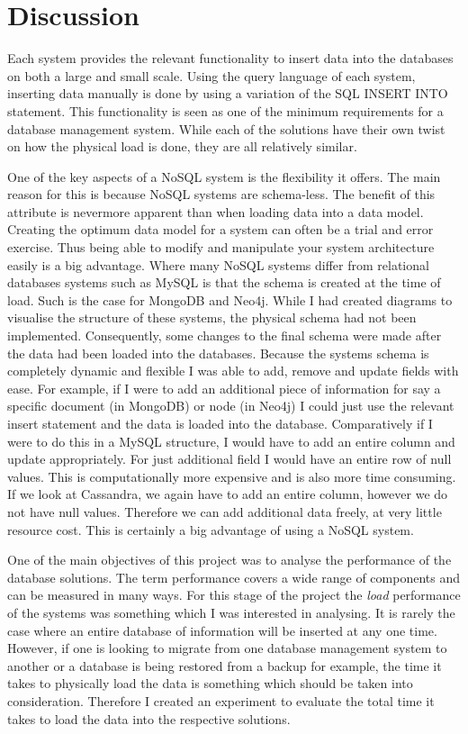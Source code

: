 \section{Discussion}\label{loaddiscussion}
Each system provides the relevant functionality to insert data into the databases on both a large and small scale. Using the query language of each system, inserting data manually is done by using a variation of the SQL INSERT INTO statement. This functionality is seen as one of the minimum requirements for a database management system. While each of the solutions have their own twist on how the physical load is done, they are all relatively similar.

One of the key aspects of a NoSQL system is the flexibility it offers. The main reason for this is because NoSQL systems are schema-less. The benefit of this attribute is nevermore apparent than when loading data into a data model. Creating the optimum data model for a system can often be a trial and error exercise. Thus being able to modify and manipulate your system architecture easily is a big advantage. Where many NoSQL systems differ from relational databases systems such as MySQL is that the schema is created at the time of load. Such is the case for MongoDB and Neo4j. While I had created diagrams to visualise the structure of these systems, the physical schema had not been implemented. Consequently, some changes to the final schema were made after the data had been loaded into the databases. Because the systems schema is completely dynamic and flexible I was able to add, remove and update fields with ease. For example, if I were to add an additional piece of information for say a specific document (in MongoDB) or node (in Neo4j) I could just use the relevant insert statement and the data is loaded into the database. Comparatively if I were to do this in a MySQL structure, I would have to add an entire column and update appropriately. For just additional field I would have an entire row of null values. This is computationally more expensive and is also more time consuming. If we look at Cassandra, we again have to add an entire column, however we do not have null values. Therefore we can add additional data freely, at very little resource cost. This is certainly a big advantage of using a NoSQL system.

One of the main objectives of this project was to analyse the performance of the database solutions. The term performance covers a wide range of components and can be measured in many ways. For this stage of the project the \textit{load} performance of the systems was something which I was interested in analysing. It is rarely the case where an entire database of information will be inserted at any one time. However, if one is looking to migrate from one database management system to another or a database is being restored from a backup for example, the time it takes to physically load the data is something which should be taken into consideration. Therefore I created an experiment to evaluate the total time it takes to load the data into the respective solutions.

